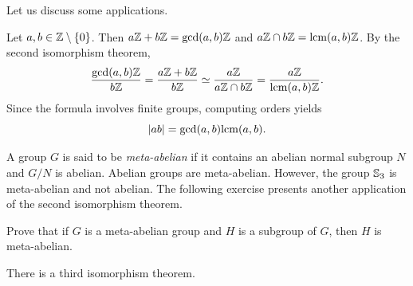 Let us discuss some applications. 

\begin{example}
Let $a,b\in\mathbb{Z}\setminus\{0\}$. Then $a\mathbb{Z}+b\mathbb{Z}=\gcd(a,b)\mathbb{Z}$ and $a\mathbb{Z}\cap b\mathbb{Z}=\mathrm{lcm}(a,b)\mathbb{Z}$. By the second isomorphism theorem,
\[
\frac{\gcd(a,b)\mathbb{Z}}{b\mathbb{Z}}=\frac{a\mathbb{Z}+b\mathbb{Z}}{b\mathbb{Z}}\simeq
\frac{a\mathbb{Z}}{a\mathbb{Z}\cap b\mathbb{Z}}=\frac{a\mathbb{Z}}{\mathrm{lcm}(a,b)\mathbb{Z}}.
\]
Since the formula involves finite groups, 
computing orders yields 
\[
|ab|=\gcd(a,b)\mathrm{lcm}(a,b).
\]
\end{example}


\begin{optional}
A group $G$ is said to be \emph{meta-abelian}
if it contains an abelian normal subgroup $N$ and $G/N$
is abelian. Abelian groups are meta-abelian. However, the group $\mathbb{S}_3$ is meta-abelian and not abelian.  The following exercise
presents another application of the second isomorphism theorem. 

\begin{xca}
Prove that if $G$ is a meta-abelian group and $H$ is a subgroup of
$G$, then $H$ is meta-abelian. 
\end{xca}
\end{optional}


There is a third isomorphism theorem. 


